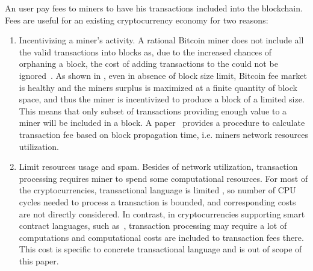 \documentclass[]{article}   %
\begin{document}


An user pay fees to miners to have his transactions included into the blockchain. Fees are useful for an existing cryptocurrency economy for two reasons:

\begin{enumerate}
  \item{Incentivizing a miner's activity. } A rational Bitcoin miner does not include all the valid transactions into blocks as, due to the increased chances of orphaning a block, the cost of adding transactions to the could not be ignored~\cite{rizun2015transaction, andresen2013}. As shown in \cite{rizun2015transaction}, even in absence of block size limit, Bitcoin fee market is healthy and the miners surplus is maximized at a finite quantity of block space, and thus the miner is incentivized to produce a block of a limited size. This means that only subset of transactions providing enough value to a miner will be included in a block. A paper~\cite{rizun2015transaction} provides a procedure to calculate transaction fee based on block propagation time, i.e. miners network resources utilization. 


  \item{Limit resources usage and spam. } Besides of network utilization, transaction processing requires miner to spend some computational resources. For most of the cryptocurrencies, transactional language is limited \cite{script}, so number of CPU cycles needed to process a transaction is bounded, and corresponding costs are not directly considered. In contrast, in cryptocurrencies supporting  smart contract languages, such as~\cite{seijas2016scripting, tezosScript, solidity}, transaction processing may require a lot of computations and computational costs are included to transaction fees there. This cost is specific to concrete transactional language and is out of scope of this paper.
\end{enumerate}
\end{document}
